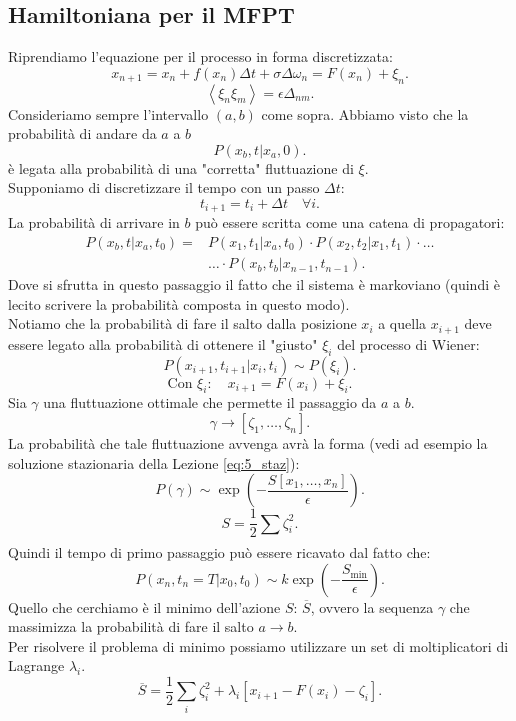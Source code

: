 \subsection{Hamiltoniana per il MFPT}%
\label{sub:Hamiltoniana per il MFPT}
Riprendiamo l'equazione per il processo in forma discretizzata:
\[
    x_{n+1} = x_n + f(x_n) \Delta t + \sigma \Delta\omega_n = F(x_n) + \xi_n
.\] 
\[
    \left<\xi_n\xi_m\right> = \epsilon\Delta_{nm}
.\] 
Consideriamo sempre l'intervallo $(a,b)$ come sopra. Abbiamo visto che la probabilità di andare da $a$ a $b$ 
\[
    P\left(x_b,t|x_a,0\right)
.\] 
è legata alla probabilità di una "corretta" fluttuazione di $\xi$. \\
Supponiamo di discretizzare il tempo con un passo $\Delta t$:
\[
    t_{i+1} = t_i + \Delta t 	\quad \forall i
.\] 
La probabilità di arrivare in $b$ può essere scritta come una catena di propagatori:
\[\begin{aligned}
    P\left(x_b,t|x_a,t_0\right)=&P\left(x_1,t_1|x_a,t_0\right)\cdot P\left(x_2,t_2|x_1,t_1\right)\cdot \ldots \\
				&\ldots \cdot P\left(x_b,t_b|x_{n-1},t_{n-1}\right)
.\end{aligned}\]
Dove si sfrutta in questo passaggio il fatto che il sistema è markoviano (quindi è lecito scrivere la probabilità composta in questo modo).\\
Notiamo che la probabilità di fare il salto dalla posizione $x_{i}$ a quella $x_{i+1}$ deve essere legato alla probabilità di ottenere il "giusto" $\xi_i$  del processo di Wiener:
\[
    P\left(x_{i+1}, t_{i+1}|x_i,t_i\right) \sim P(\xi_i) 
.\] 
\[
    \text{Con } \xi_i: \quad x_{i+1} = F(x_i) + \xi_i
.\] 
Sia $\gamma$ una fluttuazione ottimale che permette il passaggio da $a$ a $b$.
\[
	\gamma \to \left[\zeta_1, \ldots, \zeta_n\right]
.\] 
La probabilità che tale fluttuazione avvenga avrà la forma (vedi ad esempio la soluzione stazionaria della Lezione \ref{eq:5_staz}):
\[
    P(\gamma) \sim \exp\left(-\frac{S\left[x_1,\ldots,x_n\right]}{\epsilon}\right)
.\] 
\[
    S = \frac{1}{2}\sum_{}^{} \zeta^2_i
.\] 
Quindi il tempo di primo passaggio può essere ricavato dal fatto che:
\[
    P\left(x_n,t_n = T|x_0,t_0\right) \sim k \exp\left(-\frac{S_{\text{min}}}{\epsilon}\right)
.\] 
Quello che cerchiamo è il minimo dell'azione $S$: $\overline{S}$, ovvero la sequenza $\gamma$ che massimizza la probabilità di fare il salto $a\to b$.\\
Per risolvere il problema di minimo possiamo utilizzare un set di moltiplicatori di Lagrange $\lambda_i$.
\[
    \overline{S} = \frac{1}{2}\sum_{i}^{} \zeta^2_i + \lambda_i \left[x_{i+1}-F(x_i)- \zeta_i\right]
.\] 
